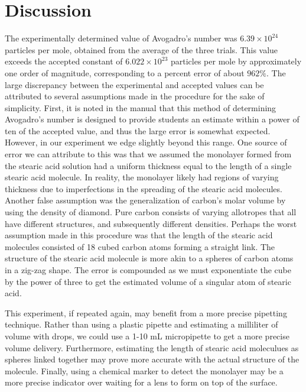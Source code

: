\documentclass[11pt]{article}
\begin{document}
 \section*{Discussion}
\hspace{2em} The experimentally determined value of Avogadro’s number was $6.39 \times 10^{24}$ particles per mole, obtained from the average of the three trials. This value exceeds 
the accepted constant of $6.022 \times 10^{23}$ particles per mole by approximately one order of magnitude, corresponding to a percent error of about \(962\%\).
The large discrepancy between the experimental and accepted values can be attributed to several assumptions made in the procedure for the sake of simplicity. First, it is noted in the manual 
that this method of determining Avogadro's number is designed to provide students an estimate within a power of ten of the accepted value, and thus the large error is somewhat expected. However,
in our experiment we edge slightly beyond this range. One source of error we can attribute to this was that we assumed the monolayer formed from the stearic acid solution had a uniform thickness equal to the length of a single stearic acid molecule. 
In reality, the monolayer likely had regions of varying thickness due to imperfections in the spreading of the stearic acid molecules. Another false assumption was the generalization of carbon's molar volume by using the density of diamond. Pure carbon consists of varying allotropes that all have 
different structures, and subsequently different densities. Perhaps the worst assumption made in this procedure was that the length of the stearic acid molecules consisted of 18 cubed carbon atoms forming a straight link. The structure of the stearic acid molecule
is more akin to a spheres of carbon atoms in a zig-zag shape. The error is compounded as we must exponentiate the cube by the power of three to get the estimated volume of a singular atom of stearic acid. 

\hspace{2em} This experiment, if repeated again, may benefit from a more precise pipetting technique. Rather than using a plastic pipette and estimating a milliliter of volume with drops, we could use a 1-10 mL micropipette to get a more precise volume delivery. Furthermore, estimating 
the length of stearic acid moleculues as spheres linked together may prove more accurate with the actual structure of the molecule. Finally, using a chemical marker to detect the monolayer may be a more precise indicator over waiting for a lens to form on top of the surface.
\end{document}
